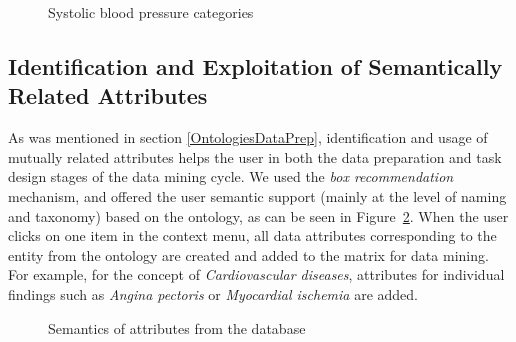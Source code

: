 \begin{figure}[ht]
\centering
\mbox{}
\caption{Systolic blood pressure categories}
\label{fig:Systolic}
\end{figure}

\subsection{Identification and Exploitation of Semantically Related Attributes} \label{RelatedAttributes}
As was mentioned in section \ref{OntologiesDataPrep}, identification and usage of mutually related attributes helps the user in both the data preparation and task design stages of the data mining cycle. 
We used the \emph{box recommendation} mechanism, and offered the user semantic support (mainly at the level of naming and taxonomy) based on the ontology, as can be seen in Figure~\ref{fig:BoxesAsking}. 
When the user clicks on one item in the context menu, all data attributes corresponding to the entity from the ontology are created and added to the matrix for data mining.
For example, for the concept of \emph{Cardiovascular diseases}, attributes for individual findings such as \emph{Angina pectoris} or \emph{Myocardial ischemia} are added.

\begin{figure}[ht]
\centering
\mbox{}
\caption{Semantics of attributes from the database}
\label{fig:BoxesAsking}
\end{figure}